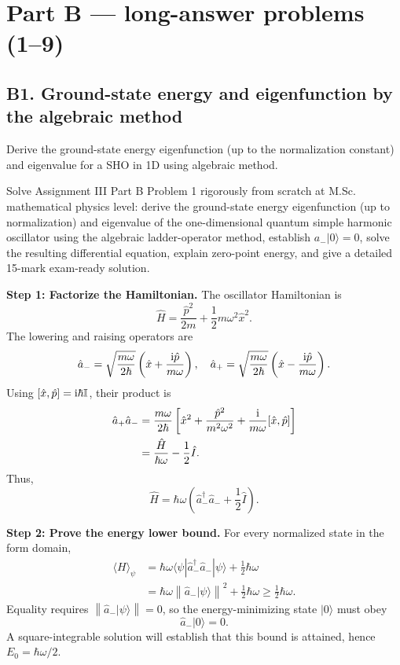 \documentclass[11pt,a4paper]{article}
\newcommand{\avg}[1]{\langle #1\rangle}\newcommand{\Sch}{Schr\"odinger}
\newcommand{\bra}[1]{\langle #1|}\newcommand{\ket}[1]{|#1\rangle}
\newcommand{\norm}[1]{\left\lVert#1\right\rVert}
\begin{document}
\section{Part B --- long-answer problems (1--9)}

\subsection{B1. Ground-state energy and eigenfunction by the algebraic method}
\begin{questionbox}
Derive the ground-state energy eigenfunction (up to the normalization constant) and eigenvalue for a SHO in 1D using algebraic method.
\end{questionbox}
\begin{studybox}
Solve Assignment III Part B Problem 1 rigorously from scratch at M.Sc. mathematical physics level: derive the ground-state energy eigenfunction (up to normalization) and eigenvalue of the one-dimensional quantum simple harmonic oscillator using the algebraic ladder-operator method, establish \(a_-|0\rangle=0\), solve the resulting differential equation, explain zero-point energy, and give a detailed 15-mark exam-ready solution.
\end{studybox}
\textbf{Step 1: Factorize the Hamiltonian.} The oscillator Hamiltonian is
\begin{equation}\hat H=\frac{\hat p^2}{2m}+\frac12m\omega^2\hat x^2.\end{equation}
The lowering and raising operators are
\begin{equation}
\hat a_-=\sqrt{\frac{m\omega}{2\hbar}}\left(\hat x+\frac{\mathrm{i}\hat p}{m\omega}\right),\quad
\hat a_+=\sqrt{\frac{m\omega}{2\hbar}}\left(\hat x-\frac{\mathrm{i}\hat p}{m\omega}\right).
\end{equation}
Using \([\hat x,\hat p]=\mathrm{i}\hbar\mathbb I\), their product is
\begin{align}
\hat a_+\hat a_-&=\frac{m\omega}{2\hbar}\left[\hat x^2+\frac{\hat p^2}{m^2\omega^2}+\frac{\mathrm{i}}{m\omega}[\hat x,\hat p]\right]\\
&=\frac{\hat H}{\hbar\omega}-\frac12\hat I.
\end{align}
Thus,
\begin{equation}\boxed{\hat H=\hbar\omega\left(\hat a_-^\dagger\hat a_-+\frac12\hat I\right).}\end{equation}

\textbf{Step 2: Prove the energy lower bound.} For every normalized state in the form domain,
\begin{align}
\avg{H}_\psi&=\hbar\omega\bra\psi\hat a_-^\dagger\hat a_-\ket\psi+\frac12\hbar\omega\\
&=\hbar\omega\norm{\hat a_-\ket\psi}^2+\frac12\hbar\omega\ge\frac12\hbar\omega.
\end{align}
Equality requires \(\norm{\hat a_-\ket\psi}=0\), so the energy-minimizing state \(\ket0\) must obey
\begin{equation}\boxed{\hat a_-\ket0=0.}\end{equation}
A square-integrable solution will establish that this bound is attained, hence \(E_0=\hbar\omega/2\).
\end{document}
